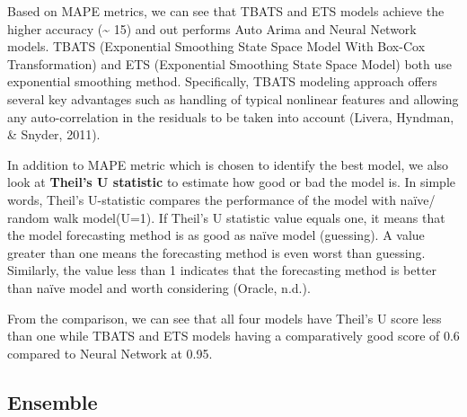 \documentclass[11pt,oneside,a4paper]{reedthesis}
\begin{document}
Based on MAPE metrics, we can see that TBATS and ETS models achieve the
higher accuracy (\textasciitilde{} 15) and out performs Auto Arima and
Neural Network models. TBATS (Exponential Smoothing State Space Model
With Box-Cox Transformation) and ETS (Exponential Smoothing State Space
Model) both use exponential smoothing method. Specifically, TBATS
modeling approach offers several key advantages such as handling of
typical nonlinear features and allowing any auto-correlation in the
residuals to be taken into account (Livera, Hyndman, \& Snyder, 2011).

In addition to MAPE metric which is chosen to identify the best model,
we also look at \textbf{Theil's U statistic} to estimate how good or bad
the model is. In simple words, Theil's U-statistic compares the
performance of the model with naïve/ random walk model(U=1). If Theil's
U statistic value equals one, it means that the model forecasting method
is as good as naïve model (guessing). A value greater than one means the
forecasting method is even worst than guessing. Similarly, the value
less than 1 indicates that the forecasting method is better than naïve
model and worth considering (Oracle, n.d.).

From the comparison, we can see that all four models have Theil's U
score less than one while TBATS and ETS models having a comparatively
good score of 0.6 compared to Neural Network at 0.95.

\subsection{Ensemble}\label{ensemble}
\end{document}
